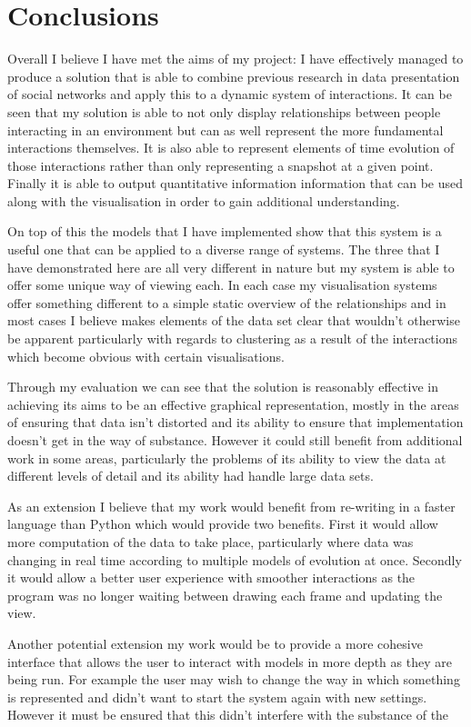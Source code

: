 \documentclass[12pt,a4paper]{article}
\begin{document}
\section{Conclusions}
\noindent
Overall I believe I have met the aims of my project: I have effectively managed to produce a solution that is able to combine previous research in data presentation of social networks and apply this to a dynamic system of interactions. It can be seen that my solution is able to not only display relationships between people interacting in an environment but can as well represent the more fundamental interactions themselves. It is also able to represent elements of time evolution of those interactions rather than only representing a snapshot at a given point. Finally it is able to output quantitative information information that can be used along with the visualisation in order to gain additional understanding.

On top of this the models that I have implemented show that this system is a useful one that can be applied to a diverse range of systems. The three that I have demonstrated here are all very different in nature but my system is able to offer some unique way of viewing each. In each case my visualisation systems offer something different to a simple static overview of the relationships and in most cases I believe makes elements of the data set clear that wouldn't otherwise be apparent particularly with regards to clustering as a result of the interactions which become obvious with certain visualisations.

Through my evaluation we can see that the solution is reasonably effective in achieving its aims to be an effective graphical representation, mostly in the areas of ensuring that data isn't distorted and its ability to ensure that implementation doesn't get in the way of substance. However it could still benefit from additional work in some areas, particularly the problems of its ability to view the data at different levels of detail and its ability had handle large data sets. 

As an extension I believe that my work would benefit from re-writing in a faster language than Python which would provide two benefits. First it would allow more computation of the data to take place, particularly where data was changing in real time according to multiple models of evolution at once. Secondly it would allow a better user experience with smoother interactions as the program was no longer waiting between drawing each frame and updating the view.

Another potential extension my work would be to provide a more cohesive interface that allows the user to interact with models in more depth as they are being run. For example the user may wish to change the way in which something is represented and didn't want to start the system again with new settings. However it must be ensured that this didn't interfere with the substance of the 


\end{document}
